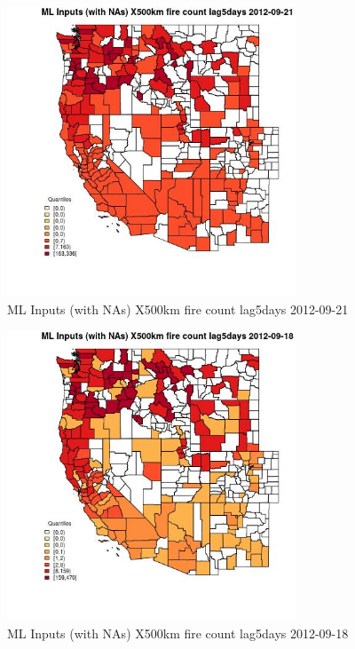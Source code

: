 \clearpage 

\begin{figure} 
\centering  
\includegraphics[width=0.77\textwidth]{Code_Outputs/Report_ML_input_PM25_Step4_part_e_de_duplicated_aves_compiled_2019-05-14wNAs_CountyX500km_fire_count_lag5daysMean2012-09-21_2012-09-21.jpg} 
\caption{\label{fig:Report_ML_input_PM25_Step4_part_e_de_duplicated_aves_compiled_2019-05-14wNAsCountyX500km_fire_count_lag5daysMean2012-09-21_2012-09-21}ML Inputs (with NAs) X500km fire count lag5days 2012-09-21} 
\end{figure} 
 

\begin{figure} 
\centering  
\includegraphics[width=0.77\textwidth]{Code_Outputs/Report_ML_input_PM25_Step4_part_e_de_duplicated_aves_compiled_2019-05-14wNAs_CountyX500km_fire_count_lag5daysMean2012-09-18_2012-09-18.jpg} 
\caption{\label{fig:Report_ML_input_PM25_Step4_part_e_de_duplicated_aves_compiled_2019-05-14wNAsCountyX500km_fire_count_lag5daysMean2012-09-18_2012-09-18}ML Inputs (with NAs) X500km fire count lag5days 2012-09-18} 
\end{figure} 
 

